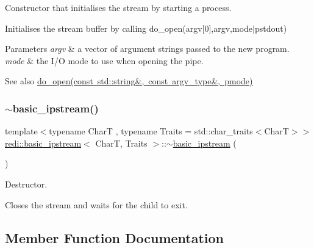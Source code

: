 Constructor that initialises the stream by starting a process. 

Initialises the stream buffer by calling {\ttfamily do\+\_\+open}(argv\mbox{[}0\mbox{]},argv,mode$\vert$pstdout)


\begin{DoxyParams}{Parameters}
{\em argv} & a vector of argument strings passed to the new program. \\
\hline
{\em mode} & the I/O mode to use when opening the pipe. \\
\hline
\end{DoxyParams}
\begin{DoxySeeAlso}{See also}
\mbox{\hyperlink{classredi_1_1pstream__common_a352b77fa600f7ebe0d8f1582be05ae4d}{do\+\_\+open(const std\+::string\&, const argv\+\_\+type\&, pmode)}} 
\end{DoxySeeAlso}
\mbox{\label{classredi_1_1basic__ipstream_a8be5caacc66851d26a8377d90ec1923c}} 
\subsubsection{\texorpdfstring{$\sim$basic\+\_\+ipstream()}{~basic\_ipstream()}}
{\footnotesize\ttfamily template$<$typename CharT , typename Traits  = std\+::char\+\_\+traits$<$\+Char\+T$>$$>$ \\
\mbox{\hyperlink{classredi_1_1basic__ipstream}{redi\+::basic\+\_\+ipstream}}$<$ CharT, Traits $>$\+::$\sim$\mbox{\hyperlink{classredi_1_1basic__ipstream}{basic\+\_\+ipstream}} (\begin{DoxyParamCaption}{ }\end{DoxyParamCaption})\hspace{0.3cm}{\ttfamily [inline]}}



Destructor. 

Closes the stream and waits for the child to exit. 

\subsection{Member Function Documentation}
\mbox{\label{classredi_1_1basic__ipstream_a7057a0f44305277d67ee86e653e486e6}} 
